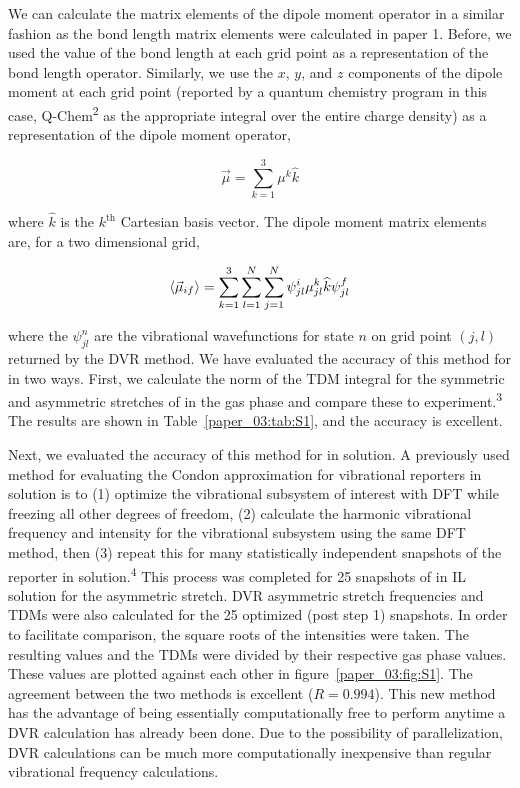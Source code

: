 We can calculate the matrix elements of the dipole moment operator in a similar fashion as the bond length matrix elements were calculated in paper 1. Before, we used the value of the bond length at each grid point as a representation of the bond length operator. Similarly, we use the \(x\), \(y\), and \(z\) components of the dipole moment at each grid point (reported by a quantum chemistry program \textemdash{} in this case, Q-Chem\textsuperscript{2} \textemdash{} as the appropriate integral over the entire charge density) as a representation of the dipole moment operator,

\begin{equation}
  \label{paper_03:eq:S2}
  \vec{\mu} = \sum_{k = 1}^{3} \mu^k \widehat{k}
\end{equation}

where \(\widehat{k}\) is the \(k^{\text{th}}\) Cartesian basis vector. The dipole moment matrix elements are, for a two dimensional grid,

\begin{equation}
  \label{paper_03:eq:S3}
  \Braket{ \vec{\mu}_{if} } = \sum_{k = 1}^{3} \sum_{l = 1}^{N} \sum_{j = 1}^{N} \psi_{jl}^{i} \mu_{jl}^{k} \widehat{k} \psi_{jl}^{f}
\end{equation}

where the \(\psi_{jl}^{n}\) are the vibrational wavefunctions for state \(n\) on grid point \((j,l)\) returned by the DVR method. We have evaluated the accuracy of this method for  in two ways. First, we calculate the norm of the TDM integral for the symmetric and asymmetric stretches of  in the gas phase and compare these to experiment.\textsuperscript{3} The results are shown in Table~\ref{paper_03:tab:S1}, and the accuracy is excellent.

Next, we evaluated the accuracy of this method for  in solution. A previously used method for evaluating the Condon approximation for vibrational reporters in solution is to (1) optimize the vibrational subsystem of interest with DFT while freezing all other degrees of freedom, (2) calculate the harmonic vibrational frequency and intensity for the vibrational subsystem using the same DFT method, then (3) repeat this for many statistically independent snapshots of the reporter in solution.\textsuperscript{4} This process was completed for \num{25} snapshots of  in IL solution for the asymmetric stretch. DVR asymmetric stretch frequencies and TDMs were also calculated for the \num{25} optimized (post step 1) snapshots. In order to facilitate comparison, the square roots of the intensities were taken. The resulting values and the TDMs were divided by their respective gas phase values. These values are plotted against each other in figure~\ref{paper_03:fig:S1}. The agreement between the two methods is excellent (\(R = 0.994\)). This new method has the advantage of being essentially computationally free to perform anytime a DVR calculation has already been done. Due to the possibility of parallelization, DVR calculations can be much more computationally inexpensive than regular vibrational frequency calculations.

